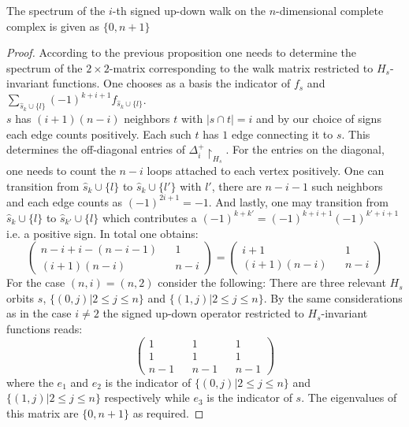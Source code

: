 \documentclass[10pt,a4paper]{amsart}
\begin{document}
    \begin{proposition}
        The spectrum of the $i$-th signed up-down walk on the $n$-dimensional complete complex is given as $\{0,n+1\}$
        \label{prop:UpDownSimplex}
    \end{proposition}

    \begin{proof}
        According to the previous proposition one needs to determine the spectrum of the $2\times 2$-matrix corresponding to the walk matrix restricted to $H_s$-invariant functions. One chooses as a basis the indicator of $f_s$ and $\sum_{\hat{s}_k\cup\{l\}}(-1)^{k+i+1}f_{\hat{s}_k\cup\{l\}}$.\\
        $s$ has $(i+1)(n-i)$ neighbors $t$ with $|s\cap t|=i$ and by our choice of signs each edge counts positively. Each such $t$ has $1$ edge connecting it to $s$. This determines the off-diagonal entries of $\Delta_i^+\restriction_{H_s}$. For the entries on the diagonal, one needs to count the $n-i$ loops attached to each vertex positively.
        One can transition from $\hat{s}_k\cup\{l\}$ to $\hat{s}_k\cup\{l'\}$ with $l'$, there are $n-i-1$ such neighbors and each edge counts as $(-1)^{2i+1}=-1$. And lastly, one may transition from $\hat{s}_k\cup\{l\}$ to $\hat{s}_{k'}\cup\{l\}$ which contributes a $(-1)^{k+k'}=(-1)^{k+i+1}(-1)^{k'+i+1}$ i.e. a positive sign. In total one obtains:
        \begin{equation}
            \begin{pmatrix}
                n-i+i-(n-i-1)&&1\\
                (i+1)(n-i)&&n-i              
            \end{pmatrix}=\begin{pmatrix}
                i+1&&1\\
                (i+1)(n-i)&&n-i              
            \end{pmatrix}
        \end{equation}
        For the case $(n,i)=(n,2)$ consider the following: There are three relevant $H_s$ orbits $s$, $\{(0,j)|2\leq j\leq n\}$ and $\{(1,j)|2\leq j\leq n\}$. By the same considerations as in the case $i\neq 2$ the signed up-down operator restricted to $H_s$-invariant functions reads:
        \begin{equation}
            \begin{pmatrix}
                1&&1&&1\\
                1&&1&&1\\
                n-1&&n-1&&n-1
            \end{pmatrix}
        \end{equation}
        where the $e_1$ and $e_2$ is the indicator of $\{(0,j)|2\leq j\leq n\}$ and $\{(1,j)|2\leq j\leq n\}$ respectively while $e_3$ is the indicator of $s$. The eigenvalues of this matrix are $\{0,n+1\}$ as required. 
    \end{proof}
\end{document}
